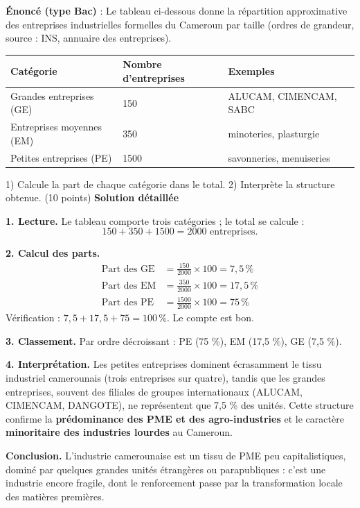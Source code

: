 \documentclass[11pt]{article}
\begin{document}
\begin{exoresolu}
\textbf{Énoncé (type Bac)} : Le tableau ci-dessous donne la répartition approximative des entreprises industrielles formelles du Cameroun par taille (ordres de grandeur, source : INS, annuaire des entreprises).

\begin{center}
\begin{tabularx}{\linewidth}{|l|X|X|}\hline
\rowcolor{popblueL} \textbf{Catégorie} & \textbf{Nombre d'entreprises} & \textbf{Exemples} \\ \hline
Grandes entreprises (GE) & 150 & ALUCAM, CIMENCAM, SABC \\ \hline
Entreprises moyennes (EM) & 350 & minoteries, plasturgie \\ \hline
Petites entreprises (PE) & 1500 & savonneries, menuiseries \\ \hline
\end{tabularx}
\end{center}

1) Calcule la part de chaque catégorie dans le total. 2) Interprète la structure obtenue. (10 points)
\tcblower
\textbf{Solution détaillée}

\textbf{1. Lecture.} Le tableau comporte trois catégories ; le total se calcule :
\[ 150 + 350 + 1500 = 2000 \text{ entreprises.} \]

\textbf{2. Calcul des parts.}
\begin{align*}
\text{Part des GE} &= \frac{150}{2000} \times 100 = 7{,}5\,\text{\%} \\
\text{Part des EM} &= \frac{350}{2000} \times 100 = 17{,}5\,\text{\%} \\
\text{Part des PE} &= \frac{1500}{2000} \times 100 = 75\,\text{\%}
\end{align*}
Vérification : $7{,}5 + 17{,}5 + 75 = 100\,\text{\%}$. Le compte est bon.

\textbf{3. Classement.} Par ordre décroissant : PE (75 \%), EM (17,5 \%), GE (7,5 \%).

\textbf{4. Interprétation.} Les petites entreprises dominent écrasamment le tissu industriel camerounais (trois entreprises sur quatre), tandis que les grandes entreprises, souvent des filiales de groupes internationaux (ALUCAM, CIMENCAM, DANGOTE), ne représentent que 7,5 \% des unités. Cette structure confirme la \textbf{prédominance des PME et des agro-industries} et le caractère \textbf{minoritaire des industries lourdes} au Cameroun.

\textbf{Conclusion.} L'industrie camerounaise est un tissu de PME peu capitalistiques, dominé par quelques grandes unités étrangères ou parapubliques : c'est une industrie encore fragile, dont le renforcement passe par la transformation locale des matières premières.
\end{exoresolu}
\end{document}
